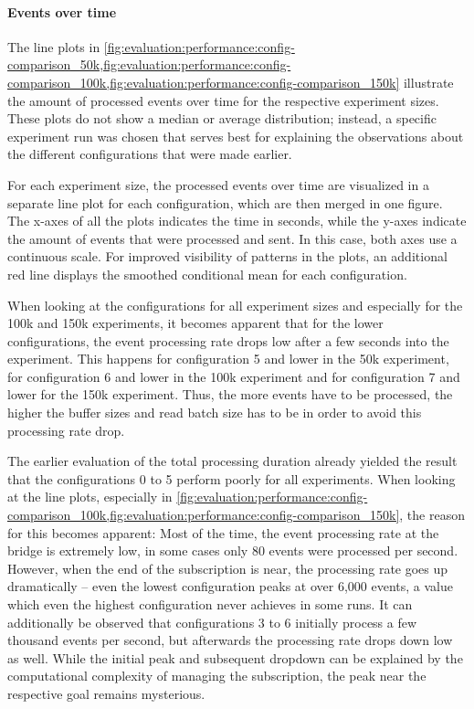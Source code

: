 \paragraph{Events over time}

The line plots in \cref{fig:evaluation:performance:config-comparison_50k,fig:evaluation:performance:config-comparison_100k,fig:evaluation:performance:config-comparison_150k} illustrate the amount of processed events over time for the respective experiment sizes.
These plots do not show a median or average distribution; instead, a specific experiment run was chosen that serves best for explaining the observations about the different configurations that were made earlier.

For each experiment size, the processed events over time are visualized in a separate line plot for each configuration, which are then merged in one figure.
The x-axes of all the plots indicates the time in seconds, while the y-axes indicate the amount of events that were processed and sent.
In this case, both axes use a continuous scale.
For improved visibility of patterns in the plots, an additional red line displays the smoothed conditional mean for each configuration.

When looking at the configurations for all experiment sizes and especially for the 100k and 150k experiments, it becomes apparent that for the lower configurations, the event processing rate drops low after a few seconds into the experiment.
This happens for configuration 5 and lower in the 50k experiment, for configuration 6 and lower in the 100k experiment and for configuration 7 and lower for the 150k experiment.
Thus, the more events have to be processed, the higher the buffer sizes and read batch size has to be in order to avoid this processing rate drop.

The earlier evaluation of the total processing duration already yielded the result that the configurations 0 to 5 perform poorly for all experiments.
When looking at the line plots, especially in \cref{fig:evaluation:performance:config-comparison_100k,fig:evaluation:performance:config-comparison_150k}, the reason for this becomes apparent:
Most of the time, the event processing rate at the bridge is extremely low, in some cases only 80 events were processed per second.
However, when the end of the subscription is near, the processing rate goes up dramatically -- even the lowest configuration peaks at over 6,000 events, a value which even the highest configuration never achieves in some runs.
It can additionally be observed that configurations 3 to 6 initially process a few thousand events per second, but afterwards the processing rate drops down low as well.
While the initial peak and subsequent dropdown can be explained by the computational complexity of managing the subscription, the peak near the respective goal remains mysterious.

